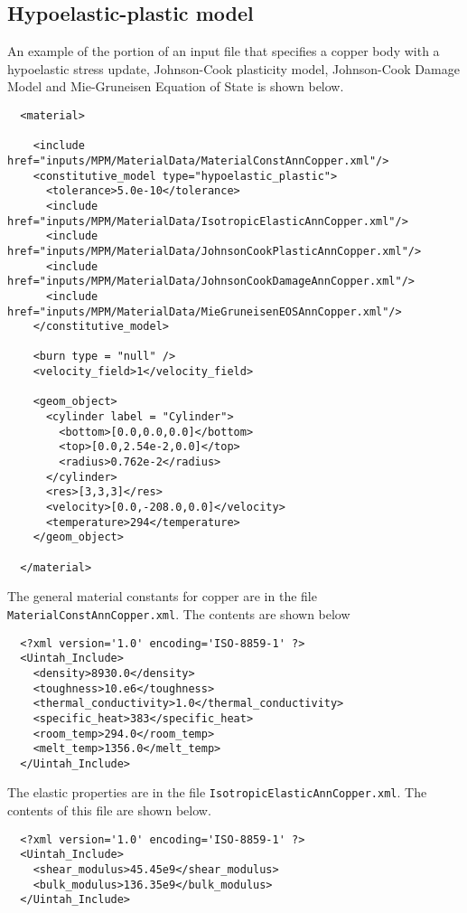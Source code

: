   \subsection{Hypoelastic-plastic model}
  An example of the portion of an input file that specifies a copper body
  with a hypoelastic stress update, Johnson-Cook plasticity model,
  Johnson-Cook Damage Model and Mie-Gruneisen Equation of State is shown 
  below.
  \begin{verbatim}
  <material>

    <include href="inputs/MPM/MaterialData/MaterialConstAnnCopper.xml"/>
    <constitutive_model type="hypoelastic_plastic">
      <tolerance>5.0e-10</tolerance>
      <include href="inputs/MPM/MaterialData/IsotropicElasticAnnCopper.xml"/>
      <include href="inputs/MPM/MaterialData/JohnsonCookPlasticAnnCopper.xml"/>
      <include href="inputs/MPM/MaterialData/JohnsonCookDamageAnnCopper.xml"/>
      <include href="inputs/MPM/MaterialData/MieGruneisenEOSAnnCopper.xml"/>
    </constitutive_model>

    <burn type = "null" />
    <velocity_field>1</velocity_field>

    <geom_object>
      <cylinder label = "Cylinder">
        <bottom>[0.0,0.0,0.0]</bottom>
        <top>[0.0,2.54e-2,0.0]</top>
        <radius>0.762e-2</radius>
      </cylinder>
      <res>[3,3,3]</res>
      <velocity>[0.0,-208.0,0.0]</velocity>
      <temperature>294</temperature>
    </geom_object>

  </material>
  \end{verbatim}

  The general material constants for copper are in the file 
  \verb+MaterialConstAnnCopper.xml+.  The contents are shown below
  \begin{verbatim}
  <?xml version='1.0' encoding='ISO-8859-1' ?>
  <Uintah_Include>
    <density>8930.0</density>
    <toughness>10.e6</toughness>
    <thermal_conductivity>1.0</thermal_conductivity>
    <specific_heat>383</specific_heat>
    <room_temp>294.0</room_temp>
    <melt_temp>1356.0</melt_temp>
  </Uintah_Include>
  \end{verbatim}

  The elastic properties are in the file \verb+IsotropicElasticAnnCopper.xml+.
  The contents of this file are shown below.
  \begin{verbatim}
  <?xml version='1.0' encoding='ISO-8859-1' ?>
  <Uintah_Include>
    <shear_modulus>45.45e9</shear_modulus>
    <bulk_modulus>136.35e9</bulk_modulus>
  </Uintah_Include>
  \end{verbatim}
  
